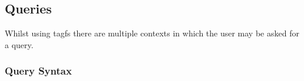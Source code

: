 
\subsection{Queries}
\label{sec:queries}

Whilst using tagfs there are multiple contexts in which the user may be asked
for a query.

\subsubsection{Query Syntax}
\label{sec:query-syntax}















